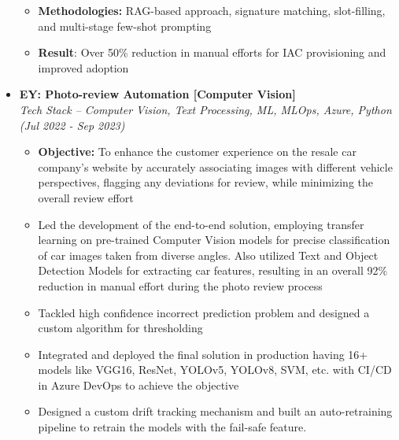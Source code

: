 \documentclass[a4paper,10pt]{article}
\newcommand{\isep}{-2 pt}
\begin{document}
\begin{itemize}
\begin{itemize}
    \item \textbf{Methodologies: }  RAG-based approach, signature matching, slot-filling, and multi-stage few-shot prompting
    \item \textbf{Result}: Over 50\% reduction in manual efforts for IAC provisioning and improved adoption
    \\ [-0.5cm]
    \end{itemize}

\item \textbf{EY: Photo-review Automation [Computer Vision]}  \\
    \emph{Tech Stack -- Computer Vision, Text Processing, ML, MLOps, Azure, Python} \hfill {\emph{(Jul 2022 - Sep 2023)}}
    \\[-0.6cm]
    \begin{itemize}\itemsep \isep
    	\item \textbf{Objective:} To enhance the customer experience on the resale car company's website by accurately associating images with different vehicle perspectives, flagging any deviations for review, while minimizing the overall review effort 
        \item Led the development of the end-to-end solution, employing transfer learning on pre-trained Computer Vision models for precise classification of car images taken from diverse angles. Also utilized Text and Object Detection Models for extracting car features, resulting in an overall 92\% reduction in manual effort during the photo review process
        \item Tackled high confidence incorrect prediction problem and designed a custom algorithm for thresholding
        \item Integrated and deployed the final solution in production having 16+ models like VGG16, ResNet, YOLOv5, YOLOv8, SVM, etc. with CI/CD in Azure DevOps to achieve the objective
        \item Designed a custom drift tracking mechanism and built an auto-retraining pipeline to retrain the models with the fail-safe feature.
        \\ [-0.5cm]
    \end{itemize}


\end{itemize}
\end{document}
